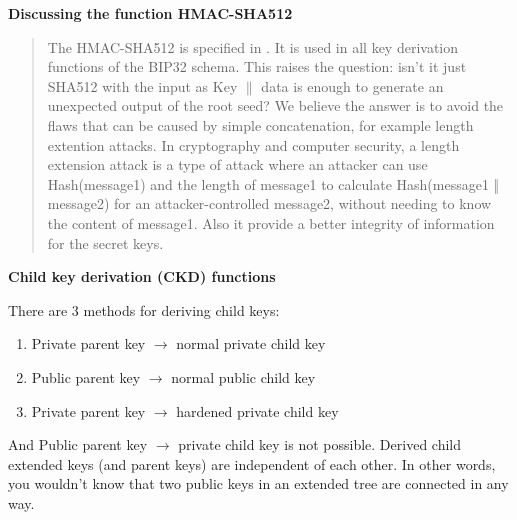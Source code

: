 \bigskip
\begin{adjustwidth}{1cm}{}
    \textbf{Discussing the function HMAC-SHA512}
    \begin{quote}

        The HMAC-SHA512 is specified in \cite{Nystrom2005}. It is used in all key derivation functions of the BIP32 schema.
        This raises the question: isn't it just SHA512 with the input as Key $\parallel$ data is enough to generate an unexpected output of the root seed? We believe the answer is to avoid the
        flaws that can be caused by simple concatenation, for example length extention attacks. In cryptography and computer security, a length extension attack is a type of attack where an attacker can use Hash(message1) and the length of message1 to calculate Hash(message1 ‖ message2) for an attacker-controlled message2, without needing to know the content of message1.
        Also it provide a better integrity of information for the secret keys.
    \end{quote}

\end{adjustwidth}

\bigskip
{\textbf{Child key derivation (CKD) functions}}

There are 3 methods for deriving child keys:
\begin{enumerate}
    \item Private parent key $\rightarrow$ normal private child key
    \item Public parent key $\rightarrow$ normal public child key
    \item Private parent key $\rightarrow$ hardened private child key
\end{enumerate}
And Public parent key $\rightarrow$ private child key is not possible. Derived child extended keys (and parent keys) are independent of each other. In other words, you wouldn’t know that two public keys in an extended tree are connected in any way.


